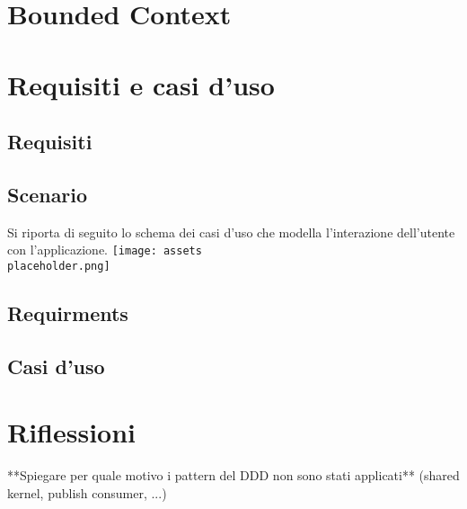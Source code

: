 \section{Bounded Context}
\section{Requisiti e casi d'uso}
\subsection{Requisiti}
\subsection{Scenario}
Si riporta di seguito lo schema dei casi d'uso che modella l'interazione dell'utente con l'applicazione.
\texttt{[image: assets\\placeholder.png]}\\[10.5cm]
\subsection{Requirments}
\subsection{Casi d'uso}
\section{Riflessioni}
**Spiegare per quale motivo i pattern del DDD non sono stati applicati**
(shared kernel, publish consumer, ...)
